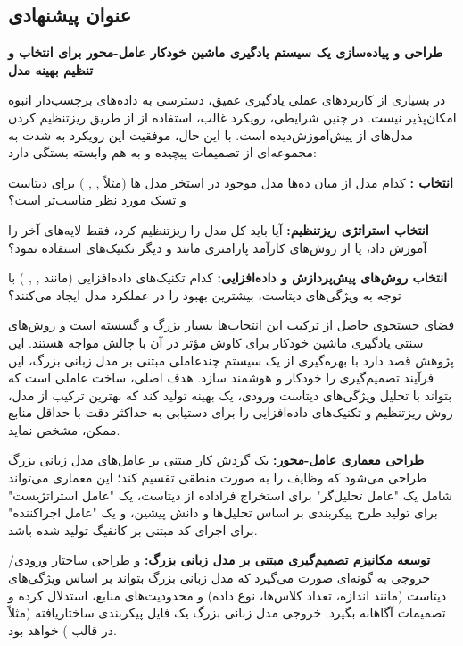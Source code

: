 \subsection*{عنوان پیشنهادی}
\textbf{طراحی و پیاده‌سازی یک سیستم یادگیری ماشین خودکار عامل-محور برای انتخاب و تنظیم بهینه مدل }

در بسیاری از کاربردهای عملی یادگیری عمیق، دسترسی به داده‌های برچسب‌دار انبوه امکان‌پذیر نیست. در چنین شرایطی، رویکرد غالب، استفاده از  از طریق ریزتنظیم کردن مدل‌های از پیش‌آموزش‌دیده است. با این حال، موفقیت این رویکرد به شدت به مجموعه‌ای از تصمیمات پیچیده و به هم وابسته بستگی دارد:

\textbf{انتخاب :} کدام مدل از میان ده‌ها مدل موجود در استخر مدل ها (مثلاً , , ) برای دیتاست و تسک مورد نظر مناسب‌تر است؟

\textbf{انتخاب استراتژی ریزتنظیم:} آیا باید کل مدل را ریزتنظیم کرد، فقط لایه‌های آخر را آموزش داد، یا از روش‌های کارآمد پارامتری مانند  و دیگر تکنیک‌های  استفاده نمود؟

\textbf{انتخاب روش‌های پیش‌پردازش و داده‌افزایی:} کدام تکنیک‌های داده‌افزایی (مانند , , ) با توجه به ویژگی‌های دیتاست، بیشترین بهبود را در عملکرد مدل ایجاد می‌کنند؟

فضای جستجوی حاصل از ترکیب این انتخاب‌ها بسیار بزرگ و گسسته است و روش‌های سنتی یادگیری ماشین خودکار برای کاوش مؤثر در آن با چالش مواجه هستند. این پژوهش قصد دارد با بهره‌گیری از یک سیستم چندعاملی مبتنی بر مدل زبانی بزرگ، این فرآیند تصمیم‌گیری را خودکار و هوشمند سازد. هدف اصلی، ساخت عاملی است که بتواند با تحلیل ویژگی‌های دیتاست ورودی، یک \textbf{} بهینه تولید کند که بهترین ترکیب از مدل، روش ریزتنظیم و تکنیک‌های داده‌افزایی را برای دستیابی به حداکثر دقت با حداقل منابع ممکن، مشخص نماید.

\textbf{طراحی معماری عامل-محور:} یک گردش کار مبتنی بر عامل‌های مدل زبانی بزرگ طراحی می‌شود که وظایف را به صورت منطقی تقسیم کند؛ این معماری می‌تواند شامل یک "عامل تحلیل‌گر" برای استخراج فراداده از دیتاست، یک "عامل استراتژیست" برای تولید طرح پیکربندی بر اساس تحلیل‌ها و دانش پیشین، و یک "عامل اجراکننده" برای اجرای کد مبتنی بر کانفیگ تولید شده باشد.

\textbf{توسعه مکانیزم تصمیم‌گیری مبتنی بر مدل زبانی بزرگ:}  و طراحی ساختار ورودی/خروجی به گونه‌ای صورت می‌گیرد که مدل زبانی بزرگ بتواند بر اساس ویژگی‌های دیتاست (مانند اندازه، تعداد کلاس‌ها، نوع داده) و محدودیت‌های منابع، استدلال کرده و تصمیمات آگاهانه بگیرد. خروجی مدل زبانی بزرگ یک فایل پیکربندی ساختاریافته (مثلاً در قالب ) خواهد بود.

